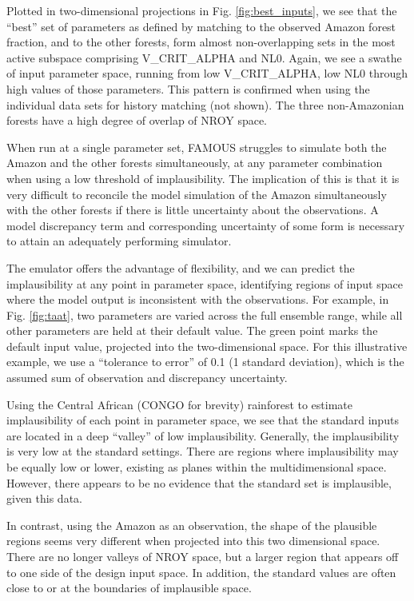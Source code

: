 \documentclass[esd, manuscript]{copernicus}
\begin{document}

Plotted in two-dimensional projections in Fig.  \ref{fig:best_inputs}, we see that the ``best'' set of parameters as defined by matching to the observed Amazon forest fraction, and to the other forests, form almost non-overlapping sets in the most active subspace comprising V\_CRIT\_ALPHA and NL0. Again, we see a swathe of input parameter space, running from low V\_CRIT\_ALPHA, low NL0 through high values of those parameters. This pattern is confirmed when using the individual data sets for history matching (not shown). The three non-Amazonian forests have a high degree of overlap of NROY space.

When run at a single parameter set, FAMOUS struggles to simulate both the Amazon and the other forests simultaneously, at any parameter combination when using a low threshold of implausibility. The implication of this is that it is very difficult to reconcile the model simulation of the Amazon simultaneously with the other forests if there is little uncertainty about the observations. A model discrepancy term and corresponding uncertainty of some form is necessary to attain an adequately performing simulator.

The emulator offers the advantage of flexibility, and we can predict the implausibility at any point in parameter space, identifying regions of input space where the model output is inconsistent with the observations. For example, in Fig.  \ref{fig:taat}, two parameters are varied across the full ensemble range, while all other parameters are held at their default value. The green point marks the default input value, projected into the two-dimensional space. For this illustrative example, we use a ``tolerance to error'' of 0.1 (1 standard deviation), which is the assumed sum of observation and discrepancy uncertainty.

Using the Central African (CONGO for brevity) rainforest to estimate implausibility of each point in parameter space, we see that the standard inputs are located in a deep ``valley'' of low implausibility. Generally, the implausibility is very low at the standard settings. There are regions where implausibility may be equally low or lower, existing as planes within the multidimensional space. However, there appears to be no evidence that the standard set is implausible, given this data.

In contrast, using the Amazon as an observation, the shape of the plausible regions seems very different when projected into this two dimensional space. There are no longer valleys of NROY space, but a larger region that appears off to one side of the design input space. In addition, the standard values are often close to or at the boundaries of implausible space.
\end{document}
